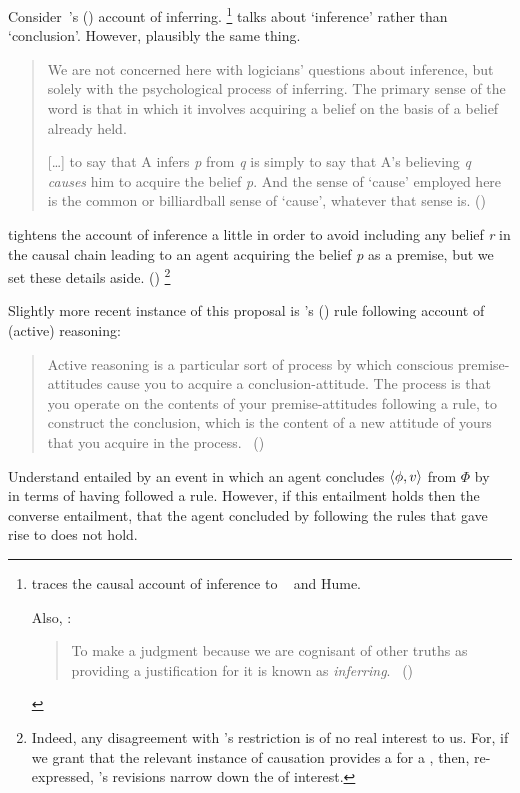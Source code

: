 \begin{note}
  Consider~\citeauthor{Armstrong:1968vh}'s (\citeyear{Armstrong:1968vh}) account of inferring.%
  \footnote{
    \citeauthor{Armstrong:1968vh} traces the causal account of inference to ~\citeauthor{Moore:1962up} and Hume.

    Also, \citeauthor{Frege:1979aa}:
  \begin{quote}
    To make a judgment because we are cognisant of other truths as providing a justification for it is known as \emph{inferring}.%
    \mbox{ }\hfill\mbox{(\cite{Frege:1979aa})}
  \end{quote}
  }
  \citeauthor{Armstrong:1968vh} talks about `inference' rather than `conclusion'.
  However, plausibly the same thing.

  \begin{quote}
    We are not concerned here with logicians' questions about inference, but solely with the psychological process of inferring.
    The primary sense of the word is that in which it involves acquiring a belief on the basis of a belief already held.

    [\dots] to say that A infers \emph{p} from \emph{q} is simply to say that A's believing \emph{q} \emph{causes} him to acquire the belief \emph{p}.
    And the sense of `cause' employed here is the common or billiardball sense of `cause', whatever that sense is.%
    \mbox{}\hfill\mbox{(\citeyear[194]{Armstrong:1968vh})}
  \end{quote}

  \citeauthor{Armstrong:1968vh} tightens the account of inference a little in order to avoid including any belief \emph{r} in the causal chain leading to an agent acquiring the belief \emph{p} as a premise, but we set these details aside.
  (\citeyear[195--197]{Armstrong:1968vh})%
  \footnote{
    Indeed, any disagreement with \citeauthor{Armstrong:1968vh}'s restriction is of no real interest to us.
    For, if we grant that the relevant instance of causation provides a \wit{} for a \ros{}, then, re-expressed, \citeauthor{Armstrong:1968vh}'s revisions narrow down the  of interest.
  }

  Slightly more recent instance of this proposal is \citeauthor{Broome:2002aa}'s (\citeyear{Broome:2013aa}) rule following account of (active) reasoning:

  \begin{quote}
    Active reasoning is a particular sort of process by which conscious premise-attitudes cause you to acquire a conclusion-attitude.
    The process is that you operate on the contents of your premise-attitudes following a rule, to construct the conclusion, which is the content of a new attitude of yours that you acquire in the process.%
    \mbox{ }\hfill\mbox{(\citeyear[234]{Broome:2002aa})}
  \end{quote}

  Understand  entailed by an event in which an agent concludes \(\langle \phi, v \rangle\) from \(\Phi\) by~\supportI{} in terms of having followed a rule.
  However, if this entailment holds then the converse entailment, that the agent concluded by following the rules that gave rise to  does not hold.
\end{note}

